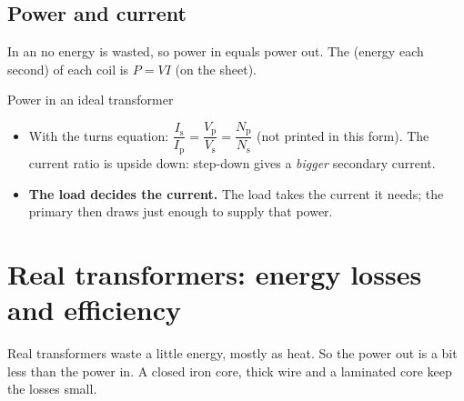 \subsection{Power and current}

In an  no energy is wasted, so power in equals power out. The
 (energy each second) of each coil is $P = VI$ (on the sheet).

\begin{formulacard}{Power in an ideal transformer}
  \begin{symbols}
  \end{symbols}
\end{formulacard}

\begin{itemize}
  \item With the turns equation:
        $\dfrac{I_\mathrm{s}}{I_\mathrm{p}} = \dfrac{V_\mathrm{p}}{V_\mathrm{s}}
        = \dfrac{N_\mathrm{p}}{N_\mathrm{s}}$ (not printed in this form). The current ratio
        is upside down: step-down gives a \emph{bigger} secondary current.
  \item \textbf{The load decides the current.} The load takes the current it needs; the
        primary then draws just enough to supply that power.
\end{itemize}

\section{Real transformers: energy losses and efficiency}\label{ch4:sec:losses}

\begin{bigidea}
Real transformers waste a little energy, mostly as heat. So the power out is a bit less
than the power in. A closed iron core, thick wire and a laminated core keep the losses
small.
\end{bigidea}

\begin{keywords}
\end{keywords}

